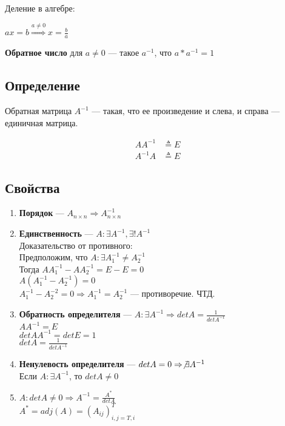 \documentclass{article}
\begin{document}
Деление в алгебре:

$ax = b \stackrel{a \ne 0}{\Rightarrow} x = \frac{b}{a}$

\textbf{Обратное число} для $a \ne 0$ --- такое $a^{-1}$, что $a * a^{-1} = 1$

\subsection{Определение}

Обратная матрица $A^{-1}$ --- такая, что ее произведение и слева, и справа --- единичная матрица.

\begin{align*}
A A^{-1} &\triangleq E \\
A^{-1} A &\triangleq E
\end{align*}

\subsection{Свойства}

\begin{enumerate}
	\item \textbf{Порядок} --- $A_{n \times n} \Rightarrow A_{n \times n}^{-1}$
	\item \textbf{Единственность} --- $A : \exists A^{-1}, \exists ! A^{-1}$\\
	Доказательство от противного:\\
	Предположим, что $A : \exists A^{-1}_1 \ne A^{-1}_2$\\
	Тогда $A A_1^{-1} - A A_2^{-1} = E - E = 0$\\
	$A(A_1^{-1} - A_2^{-1}) = 0$\\
	$A_1^{-1} - A_2^{-2} = 0 \Rightarrow A_1^{-1} = A_2^{-1}$ --- противоречие. ЧТД.
	\item \textbf{Обратность определителя} --- $A : \exists A^{-1} \Rightarrow det A = \frac{1}{det A^{-1}}$\\
	$A A^{-1} = E$\\
	$det A A^{-1} = det E = 1$\\
	$det A = \frac{1}{det A^{-1}}$
	\item \textbf{Ненулевость определителя} --- $det A = 0 \Rightarrow \not \exists A^{-1}$\\
	Если $A : \exists A^{-1}$, то $det A \ne 0$
	\item $A : det A \ne 0 \Rightarrow A^{-1} = \frac{A^*}{det A}$\\
	$A^* = adj(A) = (A_{ij})_{i,j = T,i}^T$
\end{enumerate}
\end{document}

